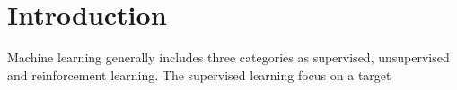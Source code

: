 \section{Introduction}

Machine learning generally includes three categories as supervised, unsupervised and reinforcement learning. The supervised learning focus on a target
